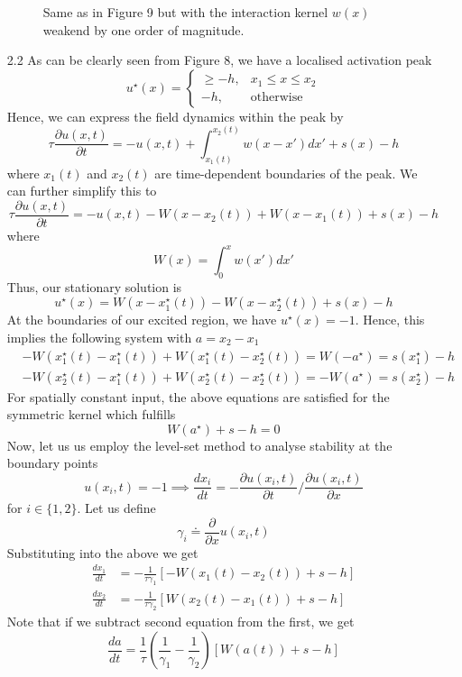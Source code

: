 \documentclass[12pt]{article}
\begin{document}
\begin{enumerate}
\begin{figure}[H]
    \caption{Same as in Figure 9 but with the interaction kernel $w(x)$ weakend by one order of magnitude.}
\end{figure}
\item[2.2] As can be clearly seen from Figure 8, we have a localised activation peak
\[
    u^{\star}(x)=\begin{cases}
                \geq -h, & x_{1} \leq x \leq x_{2}\\
                -h, & \text{otherwise}
            \end{cases} 
\] 
Hence, we can express the field dynamics within the peak by
\[
    \tau \frac{\partial u(x, t)}{\partial t} = -u(x, t) + \int_{x_{1}(t)}^{x_{2}(t)}w(x-x')dx' + s(x) - h
\]
where $x_{1}(t)$ and $x_{2}(t)$ are time-dependent boundaries of the peak. We can further simplify this to
\[
    \tau \frac{\partial u(x, t)}{\partial t} = -u(x, t) - W(x-x_{2}(t)) + W(x-x_{1}(t)) + s(x) - h
\]
where 
\[
    W(x) = \int_{0}^{x}w(x')dx'
\]
Thus, our stationary solution is
\[
    u^{\star}(x) = W(x-x_{1}^{\star}(t)) - W(x-x_{2}^{\star}(t)) + s(x) - h
\]
At the boundaries of our excited region, we have $u^{\star}(x) = -1$. Hence, this implies the following system with $a=x_{2}-x_{1}$
\begin{align*}
   &- W(x_{1}^{\star}(t)-x_{1}^{\star}(t)) + W(x_{1}^{\star}(t)-x_{2}^{\star}(t)) = W(-a^{\star}) = s(x_{1}^{\star})-h\\
   &- W(x_{2}^{\star}(t)-x_{1}^{\star}(t)) + W(x_{2}^{\star}(t)-x_{2}^{\star}(t)) = -W(a^{\star}) = s(x_{2}^{\star})-h
\end{align*}
For spatially constant input, the above equations are satisfied for the symmetric kernel which fulfills
\[
    W(a^{\star}) + s -h = 0
\]
Now, let us us employ the level-set method to analyse stability at the boundary points
\[
    u(x_{i}, t)=-1 \implies \frac{dx_{i}}{dt} = -\frac{\partial u(x_{i}, t)}{\partial t}/ \frac{\partial u(x_{i}, t)}{\partial x}  
\]
for $i \in \{1, 2\}$. Let us define
\[
 \gamma_{i} \doteq \frac{\partial}{\partial x} u(x_{i}, t)
\]
Substituting into the above we get
\begin{align*}
    \frac{dx_{1}}{dt} &= -\frac{1}{\tau \gamma_{1}}[-W(x_{1}(t)-x_{2}(t)) + s -h]\\
    \frac{dx_{2}}{dt} &= -\frac{1}{\tau \gamma_{2}}[W(x_{2}(t)-x_{1}(t)) + s -h]  
\end{align*}
Note that if we subtract second equation from the first, we get
\[
    \frac{da}{dt} = \frac{1}{\tau}\left( \frac{1}{\gamma_{1}} - \frac{1}{\gamma_{2}} \right)[W(a(t))+s-h]
\]
\end{enumerate}
\end{document}
